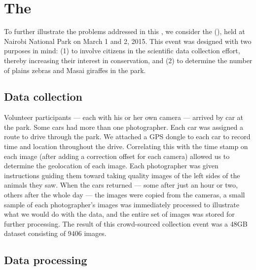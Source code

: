         \AgeFigure{}

        \GashFigure{}

\section{The \GZCFull{}}\label{sec:introgzc}

    To further illustrate the problems addressed in this \thesis{}, we consider the \GZCFull{} (\GZC{}), held at Nairobi
    National Park on March 1\st{} and 2\nd{}, 2015. This event was designed with two purposes in mind: (1) to involve
    citizens in the scientific data collection effort, thereby increasing their interest in conservation, and (2) to
    determine the number of plains zebras and Masai giraffes in the park.

    \subsection{Data collection}
        Volunteer participants --- each with his or her own camera --- arrived by car at the park. Some cars had more
        than one photographer. Each car was assigned a route to drive through the park. We attached a GPS dongle to each
        car to record time and location throughout the drive. Correlating this with the time stamp on each image (after
        adding a correction offset for each camera) allowed us to determine the geolocation of each image. Each
        photographer was given instructions guiding them toward taking quality images of the left sides of the animals
        they saw. When the cars returned --- some after just an hour or two, others after the whole day --- the images
        were copied from the cameras, a small sample of each photographer's images was immediately processed to
        illustrate what we would do with the data, and the entire set of images was stored for further processing. The
        result of this crowd-sourced collection event was a 48GB dataset consisting of $9406$ images.

    \subsection{Data processing}\label{subsec:introdataprocess}

